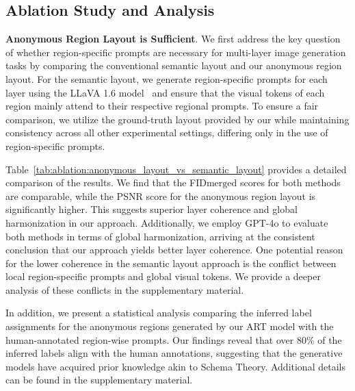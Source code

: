 \subsection{Ablation Study and Analysis}
\label{sec:ablation}

\vspace{1mm}
\noindent\textbf{Anonymous Region Layout is Sufficient}. We first address the key question of whether region-specific prompts are necessary for multi-layer image generation tasks by comparing the conventional semantic layout and our anonymous region layout. For the semantic layout, we generate region-specific prompts for each layer using the LLaVA 1.6 model~\cite{liu2023improvedllava} and ensure that the visual tokens of each region mainly attend to their respective regional prompts. To ensure a fair comparison, we utilize the ground-truth layout provided by our \designbenchmark while maintaining consistency across all other experimental settings, differing only in the use of region-specific prompts.


Table~\ref{tab:ablation:anonymous_layout_vs_semantic_layout} provides a detailed comparison of the results. We find that the FID$\scriptstyle \text{merged}$ scores for both methods are comparable, while the PSNR score for the anonymous region layout is significantly higher. This suggests superior layer coherence and global harmonization in our approach. Additionally, we employ GPT-4o to evaluate both methods in terms of global harmonization, arriving at the consistent conclusion that our approach yields better layer coherence. One potential reason for the lower coherence in the semantic layout approach is the conflict between local region-specific prompts and global visual tokens. We provide a deeper analysis of these conflicts in the supplementary material.

In addition, we present a statistical analysis comparing the inferred label assignments for the anonymous regions generated by our ART model with the human-annotated region-wise prompts. Our findings reveal that over 80\% of the inferred labels align with the human annotations, suggesting that the generative models have acquired prior knowledge akin to Schema Theory. Additional details can be found in the supplementary material.




